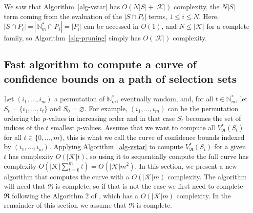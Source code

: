 \documentclass[
  11pt,
  a4paper,
]{article}
\theoremstyle{plain}
\theoremstyle{definition}
\theoremstyle{plain}
\theoremstyle{definition}
\theoremstyle{plain}
\theoremstyle{remark}
\newcounter{quartocallouttipno}
\newcommand{\quartocallouttip}[1]{\refstepcounter{quartocallouttipno}\label{#1}}
\begin{document}
\begin{tcolorbox}[enhanced jigsaw, leftrule=.75mm, bottomtitle=1mm, left=2mm, coltitle=black, bottomrule=.15mm, opacityback=0, colbacktitle=quarto-callout-tip-color!10!white, breakable, titlerule=0mm, colframe=quarto-callout-tip-color-frame, colback=white, arc=.35mm, toptitle=1mm, rightrule=.15mm, opacitybacktitle=0.6, title=\textcolor{quarto-callout-tip-color}{\faLightbulb}\hspace{0.5em}{Tip \ref*{tip-pruning-complexity} }, toprule=.15mm]

\quartocallouttip{tip-pruning-complexity} 

We saw that  Algorithm~\ref{alg-vstar}  has \(O(N|S|+|\mathcal{K}|)\)
complexity, the \(N|S|\) term coming from the evaluation of the
\(|S\cap P_i|\) terms, \(1\leq i\leq N\). Here,
\(|S\cap P_i|=|\mathbb{N}_m^*\cap P_i|=|P_i|\) can be accessed in
\(O(1)\), and \(N\leq |\mathcal{K}|\) for a complete family, so
 Algorithm~\ref{alg-pruning}  simply has \(O(|\mathcal{K}|)\)
complexity.

\end{tcolorbox}

\subsection{Fast algorithm to compute a curve of confidence bounds on a
path of selection sets}\label{sec-fast-curve}

Let \((i_1,\dotsc, i_m)\) a permutation of \(\mathbb{N}_m^*\),
eventually random, and, for all \(t\in\mathbb{N}_m^*\), let
\(S_t=\{i_1,\dotsc,i_t\}\) and \(S_0=\varnothing\). For example,
\((i_1,\dotsc, i_m)\) can be the permutation ordering the \(p\)-values
in increasing order and in that case \(S_t\) becomes the set of indices
of the \(t\) smallest \(p\)-values. Assume that we want to compute all
\(V^*_{\mathfrak{R}}(S_t)\) for all \(t\in\{ 0,\dotsc,m\}\), this is
what we call the curve of confidence bounds indexed by
\((i_1,\dotsc, i_m).\) Applying  Algorithm~\ref{alg-vstar}  to compute
\(V^*_{\mathfrak{R}}(S_t)\) for a given \(t\) has complexity
\(O(|\mathcal{K}|t)\), so using it to sequentially compute the full
curve has complexity
\(O\left(  |\mathcal{K}|\sum_{t=0}^m t\right)=O\left(|\mathcal{K}|m^2\right)\).
In this section, we present a new algorithm that computes the curve with
a \(O\left(|\mathcal{K}|m\right)\) complexity. The algorithm will need
that \(\mathfrak{R}\) is complete, so if that is not the case we first
need to complete \(\mathfrak{R}\) following the Algorithm 2 of
\citet{MR4178188}, which has a \(O(|\mathcal{K}|m)\) complexity. In the
remainder of this section we assume that \(\mathfrak{R}\) is complete.
\end{document}
